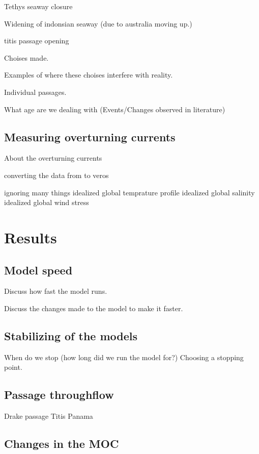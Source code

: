 \documentclass[a4paper]{article}
\begin{document}
\begin{multicols}{2}
Tethys seaway closure \cite{Hamon2013Nov}

Widening of indonsian seaway (due to australia moving up.)


titis passage opening 

Choises made. 

Examples of where these choises interfere with reality.

Individual passages.

What age are we dealing with (Events/Changes observed in literature)




\subsection{Measuring overturning currents}
About the overturning currents

converting the data from \cite{Muller2008Mar} to veros

ignoring many things
idealized global temprature profile
idealized global salinity
idealized global wind stress


\section{Results}

\subsection{Model speed}

Discuss how fast the model runs.

Discuss the changes made to the model to make it faster.


\subsection{Stabilizing of the models}
When do we stop (how long did we run the model for?)
Choosing a stopping point.


\subsection{Passage throughflow}

Drake passage
Titis
Panama

\subsection{Changes in the MOC}


\end{multicols}
\end{document}
